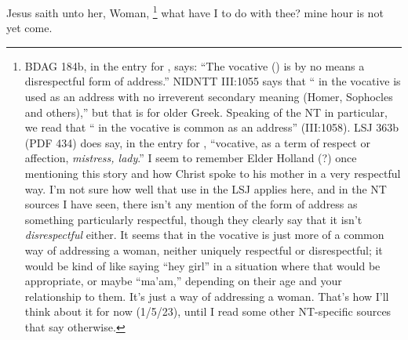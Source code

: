 			Jesus saith unto her, Woman,%
				\footnote{%
					BDAG 184b, in the entry for , says: ``The vocative ()  is by no means a disrespectful form of address.'' NIDNTT III:1055 says that `` in the vocative is used as an address with no irreverent secondary meaning (Homer, Sophocles and others),'' but that is for older Greek. Speaking of the NT in particular, we read that `` in the vocative is common as an address'' (III:1058). LSJ 363b (PDF 434) does say, in the entry for , ``vocative, as a term of respect or affection, \textit{mistress, lady}.'' I seem to remember Elder Holland (?) once mentioning this story and how Christ spoke to his mother in a very respectful way. I'm not sure how well that use in the LSJ applies here, and in the NT sources I have seen, there isn't any mention of the form of address as something particularly respectful, though they clearly say that it isn't \textit{disrespectful} either. It seems that  in the vocative is just more of a common way of addressing a woman, neither uniquely respectful or disrespectful; it would be kind of like saying ``hey girl'' in a situation where that would be appropriate, or maybe ``ma'am,'' depending on their age and your relationship to them. It's just a way of addressing a woman. That's how I'll think about it for now (1/5/23), until I read some other NT-specific sources that say otherwise.
					}
			what have I to do with thee? mine hour is not yet come.

			\begin{framed}
			\scriptsize
				\begin{compactdesc}
					\item[SBLG] 
				\end{compactdesc}
			\end{framed}

